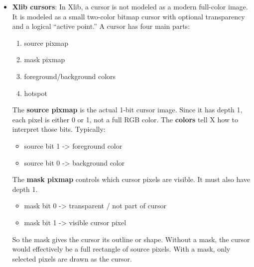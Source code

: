 \documentclass{report}
\begin{document}
\begin{itemize}
            \begin{itemize}
                \item display Specifies the connection to the X server.
                \item pixmap Specifies the pixmap.
            \end{itemize}
            The \textbf{XFreePixmap} function first deletes the association between the pixmap ID and the pixmap. Then, the X server frees the pixmap storage when there are no references to it. The pixmap should never be referenced again.
            \bigbreak \noindent 
            \textbf{XFreePixmap} can generate a \textbf{BadPixmap} error.
        \item \textbf{Xlib cursors}: In Xlib, a cursor is not modeled as a modern full-color image. It is modeled as a small two-color bitmap cursor with optional transparency and a logical “active point.”
            \bigbreak \noindent 
            A cursor has four main parts:
            \begin{enumerate}
                \item source pixmap
                \item mask pixmap
                \item foreground/background colors
                \item hotspot
            \end{enumerate}
            The \textbf{source pixmap} is the actual 1-bit cursor image. Since it has depth 1, each pixel is either 0 or 1, not a full RGB color.
            \bigbreak \noindent 
            The \textbf{colors} tell X how to interpret those bits. Typically:
            \begin{itemize}
                \item source bit 1 -> foreground color
                \item source bit 0 -> background color
            \end{itemize}
            The \textbf{mask pixmap} controls which cursor pixels are visible. It must also have depth 1.
            \begin{itemize}
                \item mask bit 0 -> transparent / not part of cursor
                \item mask bit 1 -> visible cursor pixel
            \end{itemize}
            So the mask gives the cursor its outline or shape. Without a mask, the cursor would effectively be a full rectangle of source pixels. With a mask, only selected pixels are drawn as the cursor.

\end{itemize}
\end{document}
